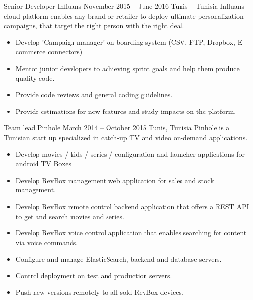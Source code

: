 \documentclass[10pt,a4paper]{resume-settings}
\begin{document}
\divider

\clearpage


\cvevent
    {Senior Developer}
    {Influans}
    {November 2015 --  June 2016}
    {Tunis -- Tunisia}
    {Influans cloud platform enables any brand or retailer to deploy ultimate personalization campaigns, that target the right person with the right deal.}
    \begin{itemize}
        \item Develop 'Campaign manager' on-boarding system (CSV, FTP, Dropbox, E-commerce connectors)
        \item Mentor junior developers to achieving sprint goals and help them produce quality code.
        \item Provide code reviews and general coding guidelines.
        \item Provide estimations for new features and study impacts on the platform.
    \end{itemize}
\divider

\cvevent
    {Team lead}
    {Pinhole}
    {March 2014 -- October 2015}
    {Tunis, Tunisia}
    {Pinhole is a Tunisian start up specialized in catch-up TV and video on-demand applications.}
    \begin{itemize}
        \item Develop movies / kids / series / configuration and launcher applications for android TV Boxes.
        \item Develop RevBox management web application for sales and stock management.
        \item Develop RevBox remote control backend application that offers a REST API to get and search movies and series.
        \item Develop RevBox voice control application that enables searching for content via voice commands.
        \item Configure and manage ElasticSearch, backend and database servers.
        \item Control deployment on test and production servers.
        \item Push new versions remotely to all sold RevBox devices.
    \end{itemize}
\divider
\end{document}
